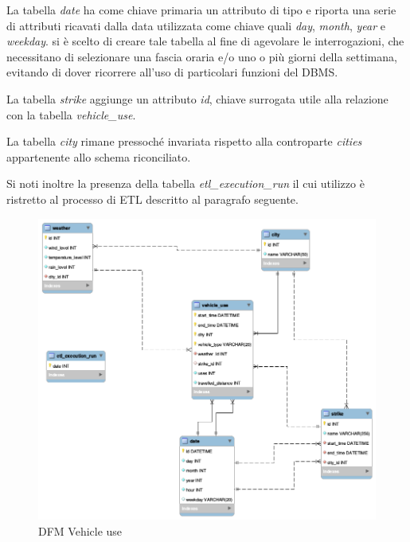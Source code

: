La tabella \textit{date} ha come chiave primaria un attributo di tipo
 e riporta una serie di attributi ricavati dalla data utilizzata
come chiave quali \textit{day}, \textit{month}, \textit{year} e
\textit{weekday}.
si è scelto di creare tale tabella al fine di agevolare le interrogazioni, che
necessitano di selezionare una fascia oraria e/o uno o più giorni della
settimana, evitando di dover ricorrere all'uso di particolari funzioni del DBMS.

La tabella \textit{strike} aggiunge un attributo \textit{id}, chiave surrogata 
utile alla relazione con la tabella \textit{vehicle\_use}.

La tabella \textit{city} rimane pressoché invariata rispetto alla controparte
\textit{cities} appartenente allo schema riconciliato.

Si noti inoltre la presenza della tabella \textit{etl\_execution\_run} il cui
utilizzo è ristretto al processo di ETL descritto al paragrafo seguente.

\begin{figure}[H]                                                                                                                                                            
\centering                                                                                                                                                                   
\includegraphics[width=\textwidth]{diagrams/logic}                                                                                                                                   
\caption{DFM Vehicle use}                                                                                                                                            
\label{fig:logic}                                                                                                                                                           
\end{figure}

